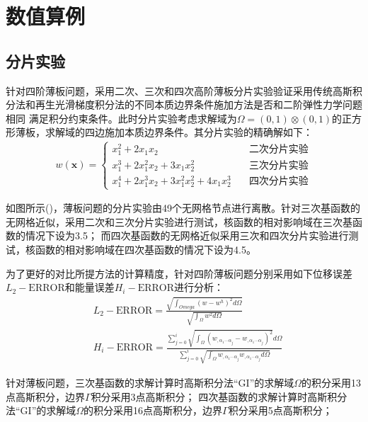 \section{数值算例}
\subsection{分片实验}
针对四阶薄板问题，采用二次、三次和四次高阶薄板分片实验验证采用传统高斯积分法和再生光滑梯度积分法的不同本质边界条件施加方法是否和二阶弹性力学问题相同
满足积分约束条件。此时分片实验考虑求解域为$\Omega=(0,1)\otimes(0,1)$的正方形薄板，求解域的四边施加本质边界条件。其分片实验的精确解如下：
\begin{equation}
\begin{split}
    w(\pmb{x})=\begin{cases}
        x_1^2+2x_1x_2\quad &\text{二次分片实验}\\
        x_1^3+2x_1^2x_2+3x_1x_2^2\quad &\text{三次分片实验}\\
        x_1^4+2x_1^3x_2+3x_1^2x_2^2+4x_1x_2^3\quad&\text{四次分片实验}
    \end{cases}
\end{split}
\end{equation}\par
如图所示()，薄板问题的分片实验由49个无网格节点进行离散。针对三次基函数的无网格近似，采用二次和三次分片实验进行测试，核函数的相对影响域在三次基函数的情况下设为3.5；
而四次基函数的无网格近似采用三次和四次分片实验进行测试，核函数的相对影响域在四次基函数的情况下设为4.5。\par
为了更好的对比所提方法的计算精度，针对四阶薄板问题分别采用如下位移误差$L_2-\text{ERROR}$和能量误差$H_i-\text{ERROR}$进行分析：
\begin{equation}
\begin{split}
    &L_2-\text{ERROR}=\frac{\sqrt{\int_{Omega}(w-w^h)^2d\Omega}}{\sqrt{\int_{\Omega}w^2d\Omega}}\\
    &H_i-\text{ERROR}=\frac{\sum_{j=0}^{i}\sqrt{\int_{\Omega}(w_{,\alpha_1\dotsb \alpha_j}-w_{,\alpha_1\dotsb \alpha_j})^2}d\Omega}{\sum_{j=0}^{i}\sqrt{\int_{\Omega}w_{,\alpha_1\dotsb \alpha_j}w_{,\alpha_1\dotsb \alpha_j}d\Omega}}
\end{split}
\end{equation}\par
针对薄板问题，三次基函数的求解计算时高斯积分法“GI”的求解域$\Omega$的积分采用13点高斯积分，边界$\Gamma$积分采用3点高斯积分；
四次基函数的求解计算时高斯积分法“GI”的求解域$\Omega$的积分采用16点高斯积分，边界$\Gamma$积分采用5点高斯积分；
